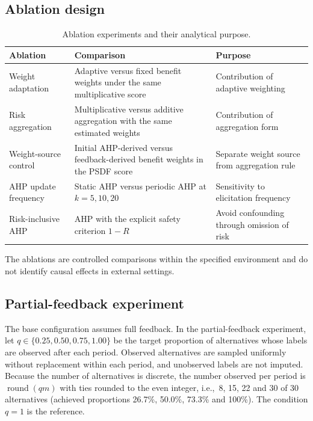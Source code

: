 \documentclass[12pt,a4paper]{article}
\newcommand{\ie}{i.e.,\ }
\begin{document}
\subsection{Ablation design}
\begin{table}[t]
\centering\small
\caption{Ablation experiments and their analytical purpose.}
\begin{tabular}{p{3.0cm}p{6.3cm}p{4.6cm}}
\toprule
Ablation & Comparison & Purpose\\
\midrule
Weight adaptation & Adaptive versus fixed benefit weights under the same multiplicative score & Contribution of adaptive weighting\\
Risk aggregation & Multiplicative versus additive aggregation with the same estimated weights & Contribution of aggregation form\\
Weight-source control & Initial AHP-derived versus feedback-derived benefit weights in the PSDF score & Separate weight source from aggregation rule\\
AHP update frequency & Static AHP versus periodic AHP at $k=5,10,20$ & Sensitivity to elicitation frequency\\
Risk-inclusive AHP & AHP with the explicit safety criterion $1-R$ & Avoid confounding through omission of risk\\
\bottomrule
\end{tabular}
\end{table}
The ablations are controlled comparisons within the specified environment and do not identify causal effects in external settings.

\subsection{Partial-feedback experiment}
The base configuration assumes full feedback. In the partial-feedback experiment, let $q\in\{0.25,0.50,0.75,1.00\}$ be the target proportion of alternatives whose labels are observed after each period. Observed alternatives are sampled uniformly without replacement within each period, and unobserved labels are not imputed. Because the number of alternatives is discrete, the number observed per period is $\operatorname{round}(qm)$ with ties rounded to the even integer, \ie 8, 15, 22 and 30 of 30 alternatives (achieved proportions 26.7\%, 50.0\%, 73.3\% and 100\%). The condition $q=1$ is the reference.
\end{document}
